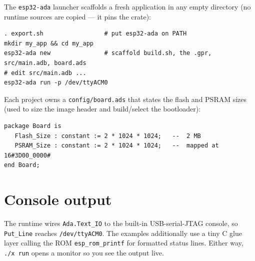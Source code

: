 The \texttt{esp32-ada} launcher scaffolds a fresh application in any empty
directory (no runtime sources are copied --- it pins the crate):

\begin{lstlisting}[style=sh]
. export.sh                 # put esp32-ada on PATH
mkdir my_app && cd my_app
esp32-ada new               # scaffold build.sh, the .gpr, src/main.adb, board.ads
# edit src/main.adb ...
esp32-ada run -p /dev/ttyACM0
\end{lstlisting}

Each project owns a \texttt{config/board.ads} that states the flash and PSRAM
sizes (used to size the image header and build/select the bootloader):

\begin{lstlisting}
package Board is
   Flash_Size : constant := 2 * 1024 * 1024;   --  2 MB
   PSRAM_Size : constant := 2 * 1024 * 1024;   --  mapped at 16#3D00_0000#
end Board;
\end{lstlisting}

\section{Console output}

The runtime wires \texttt{Ada.Text\_IO} to the built-in USB-serial-JTAG console,
so \texttt{Put\_Line} reaches \texttt{/dev/ttyACM0}. The examples additionally use
a tiny C glue layer calling the ROM \texttt{esp\_rom\_printf} for formatted status
lines. Either way, \texttt{./x run} opens a monitor so you see the output live.
